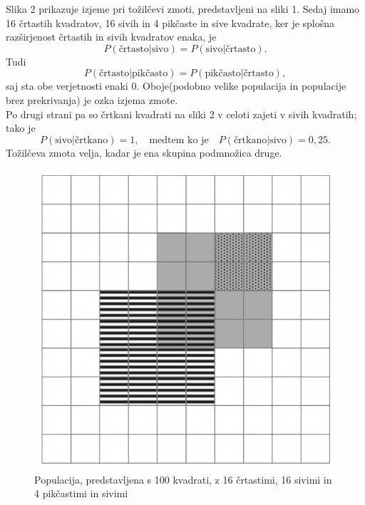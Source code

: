 \documentclass[a4paper,12pt]{article}
\begin{document}
 Slika 2 prikazuje izjeme pri tožilčevi zmoti, predstavljeni na sliki 1. Sedaj imamo 16 črtastih kvadratov, 16 sivih in 4 pikčaste in sive kvadrate, ker je splošna 
 razširjenost črtastih in sivih kvadratov enaka, je
 \[ P(\text{črtasto} \lvert \text{sivo}) = P(\text{sivo} \lvert \text{črtasto}).\]
Tudi 
\[P(\text{črtasto} \lvert \text{pikčasto}) = P(\text{pikčasto} \lvert \text{črtasto}),\]
saj sta obe verjetnosti enaki $0$. Oboje(podobno velike populacija in populacije brez prekrivanja) je ozka izjema zmote. \\
Po drugi strani pa so črtkani kvadrati na sliki 2 v celoti zajeti v sivih kvadratih; tako je 
\[P(\text{sivo} \lvert \text{črtkano}) = 1, \quad \text{medtem ko je} \quad P(\text{črtkano} \lvert \text{sivo}) = 0,25. \]
Tožilčeva zmota velja, kadar je ena skupina podmnožica druge.

\begin{figure}[!ht]
    \centering
    \label{fig:slika1}
    \includegraphics[scale=0.45]{slika2.png}
    \caption{Populacija, predstavljena s 100 kvadrati, z 16 črtastimi, 16 sivimi in 4 pikčastimi in sivimi}\vspace{2mm}
 \end{figure}
\end{document}
